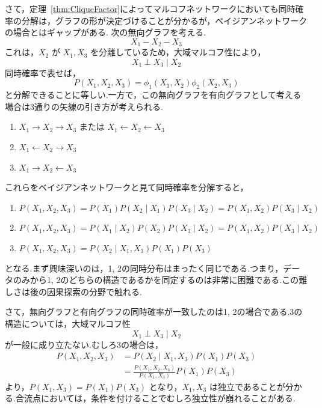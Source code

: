 \documentclass[uplatex, dvipdfmx]{jsarticle}
\begin{document}
さて，定理~\ref{thm:CliqueFactor}によってマルコフネットワークにおいても同時確率の分解は，グラフの形が決定づけることが分かるが，ベイジアンネットワークの場合とはギャップがある.
次の無向グラフを考える.
\begin{equation*}
    X_1 - X_2 - X_3
\end{equation*}
これは，$X_2$ が $X_1, X_3$ を分離しているため，大域マルコフ性により，
\begin{equation*}
    X_1 \perp X_3 \mid X_2
\end{equation*}
同時確率で表せば，
\begin{equation*}
    P(X_1, X_2, X_3) = \phi_1(X_1, X_2) \phi_2(X_2, X_3)
\end{equation*}
と分解できることに等しい.一方で，この無向グラフを有向グラフとして考える場合は3通りの矢線の引き方が考えられる.

\begin{enumerate}
    \item $X_1 \to X_2 \to X_3$ \quad または \quad $X_1 \leftarrow X_2 \leftarrow X_3$
    \item $X_1 \leftarrow X_2 \to X_3$
    \item $X_1 \to X_2 \leftarrow X_3$
\end{enumerate}

これらをベイジアンネットワークと見て同時確率を分解すると，
\begin{enumerate}
    \item $P(X_1, X_2, X_3) = P(X_1) P(X_2 \mid X_1) P(X_3 \mid X_2) = P(X_1, X_2) P(X_3 \mid X_2)$
    \item $P(X_1, X_2, X_3) = P(X_1 \mid X_2) P(X_2) P(X_3 \mid X_2) = P(X_1, X_2) P(X_3 \mid X_2)$
    \item $P(X_1, X_2, X_3) = P(X_2 \mid X_1, X_3) P(X_1) P(X_3)$
\end{enumerate}

となる.まず興味深いのは，1, 2の同時分布はまったく同じである.つまり，データのみから1, 2のどちらの構造であるかを同定するのは非常に困難である.この難しさは後の因果探索の分野で触れる.

さて，無向グラフと有向グラフの同時確率が一致したのは1, 2の場合である.3の構造については，大域マルコフ性
\begin{equation*}
    X_1 \perp X_3 \mid X_2
\end{equation*}
が一般に成り立たない.むしろ3の場合は，
\begin{align*}
    P(X_1, X_2, X_3) &= P(X_2 \mid X_1, X_3) P(X_1) P(X_3) \\
    &= \frac{P(X_1, X_2, X_3)}{P(X_1, X_3)} P(X_1) P(X_3)
\end{align*}
より，$P(X_1, X_3) = P(X_1) P(X_3)$ となり，$X_1, X_3$ は独立であることが分かる.合流点においては，条件を付けることでむしろ独立性が崩れることがある.
\end{document}
